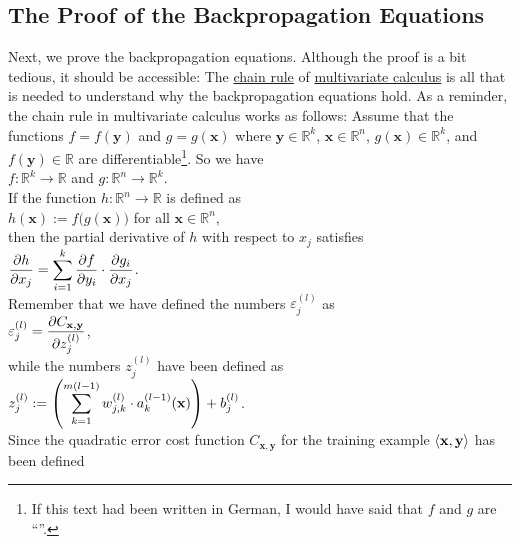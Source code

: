 \subsection{The Proof of the Backpropagation Equations}
Next, we prove the backpropagation equations.  Although the proof is a bit tedious, it should be accessible: The
\href{https://en.wikipedia.org/wiki/Chain_rule}{chain rule}  of
\href{https://en.wikipedia.org/wiki/Multivariable_calculus}{multivariate calculus} is all that is needed to  
understand why the backpropagation equations hold.  As a reminder, the chain rule in multivariate calculus
works as follows: Assume that the functions $f = f(\mathbf{y})$ and $g = g(\mathbf{x})$ where $\mathbf{y} \in \mathbb{R}^k$,
$\mathbf{x} \in \mathbb{R}^n$,  $g(\mathbf{x}) \in \mathbb{R}^k$, and $f(\mathbf{y}) \in \mathbb{R}$ are
differentiable\footnote{
  If this text had been written in German, I would have said that $f$ and $g$ are ``''.
}.  So we have
\\[0.2cm]
\hspace*{1.3cm}
$f: \mathbb{R}^k \rightarrow \mathbb{R}$ \quad and \quad
$g: \mathbb{R}^n \rightarrow \mathbb{R}^k$. 
\\[0.2cm]
If the function $h: \mathbb{R}^n \rightarrow \mathbb{R}$ is defined as
\\[0.2cm]
\hspace*{1.3cm}
$h(\mathbf{x}) := f\bigl(g(\mathbf{x})\bigr)$ \quad for all $\mathbf{x} \in \mathbb{R}^n$,
\\[0.2cm]
then the partial derivative of $h$ with respect to $x_j$ satisfies
\\[0.2cm]
\hspace*{1.3cm}
$\displaystyle \frac{\partial h}{\partial x_j} = 
 \sum\limits_{i=1}^k \frac{\partial f}{\partial y_i} \cdot \frac{\partial g_i}{\partial x_j}
$.
\\[0.2cm]
Remember that we have defined the numbers $\varepsilon_j^{(l)}$ as
\\[0.2cm]
\hspace*{1.3cm}
$\displaystyle\varepsilon_j^{(l)} = \frac{\partial C_{\mathbf{x}, \mathbf{y}}}{\partial z_j^{(l)}}$,
\\[0.2cm]
while the numbers $z_j^{(l)}$ have been defined as
\\[0.2cm]
\hspace*{1.3cm}
$\displaystyle z_j^{(l)} := \left(\sum\limits_{k=1}^{m(l-1)}  w_{j,k}^{(l)} \cdot a_k^{(l-1)}(\mathbf{x})\right) + b_j^{(l)}$.
\\[0.2cm]
Since the quadratic error cost function $C_{\mathbf{x}, \mathbf{y}}$ for the training example $\pair(\mathbf{x}, \mathbf{y})$ has been defined 
